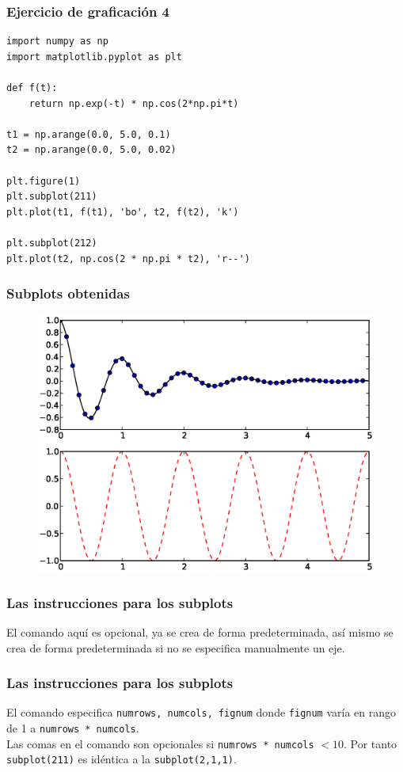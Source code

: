 \documentclass[12pt]{beamer}
\begin{document}
\begin{frame}
\frametitle{Ejercicio de graficación 4}
\begin{lstlisting}
import numpy as np
import matplotlib.pyplot as plt

def f(t):
    return np.exp(-t) * np.cos(2*np.pi*t)

t1 = np.arange(0.0, 5.0, 0.1)
t2 = np.arange(0.0, 5.0, 0.02)

plt.figure(1)
plt.subplot(211)
plt.plot(t1, f(t1), 'bo', t2, f(t2), 'k')

plt.subplot(212)
plt.plot(t2, np.cos(2 * np.pi * t2), 'r--')
\end{lstlisting}
\end{frame}
\begin{frame}[fragile]
\frametitle{Subplots obtenidas}
\begin{figure}
	\centering
	\includegraphics[scale=0.475]{Imagenes/plotEjercicio4.eps}
\end{figure}
\end{frame}
\begin{frame}
\frametitle{Las instrucciones para los subplots}
El comando  aquí es opcional, ya  se crea de forma predeterminada, \pause así mismo  se crea de forma predeterminada si no se especifica manualmente un eje.
\end{frame}
\begin{frame}
\frametitle{Las instrucciones para los subplots}
El comando  especifica \texttt{numrows, numcols, fignum} donde \texttt{fignum} varía en rango de 1 a \texttt{numrows * numcols}.
\\
\bigskip
\pause
Las comas en el comando  son opcionales si \texttt{numrows * numcols} $<10$. Por tanto \texttt{subplot(211)} es idéntica a la \texttt{subplot(2,1,1)}.
\end{frame}
\end{document}
